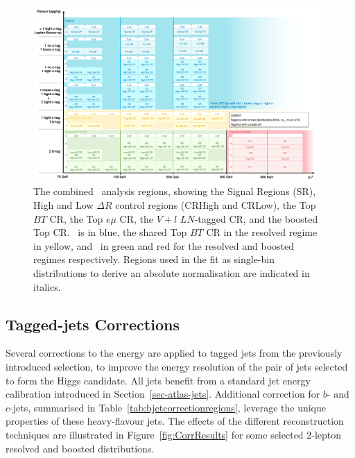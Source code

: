 \newpage

\begin{figure}
    \centering
    \includegraphics[width=\textwidth]{Images/VH/Cat/VH_analysis_catCorr.png}
    \caption{The combined \vhbc\ analysis regions, showing the Signal Regions (SR), High and Low $\Delta R$ control regions (CRHigh and CRLow), the Top $BT$ CR, the Top $e\mu$ CR, the $V+l$ $LN$-tagged CR, and the boosted Top CR. \vhc\ is in blue, the shared Top $BT$ CR in the resolved regime in yellow, and \vhb\ in green and red for the resolved and boosted regimes respectively. Regions used in the fit as single-bin distributions to derive an absolute normalisation are indicated in italics. } 
    \label{fig:ana-strat-det}
\end{figure} 

\clearpage

\subsection{Tagged-jets Corrections}\label{sec-vh-jetcor}
Several corrections to the energy are applied to tagged jets from the previously introduced selection, to improve the energy resolution of the pair of jets selected to form the Higgs candidate. All jets benefit from a standard jet energy calibration introduced in Section~\ref{sec-atlas-jets}. Additional correction for $b$- and $c$-jets, summarised in Table~\ref{tab:bjetcorrectionregions}, leverage the unique properties of these heavy-flavour jets. The effects of the different reconstruction techniques are illustrated in Figure~\ref{fig:CorrResults} for some selected 2-lepton resolved and boosted distributions. 

